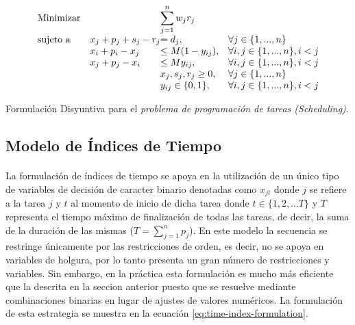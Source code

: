 \documentclass[spanish]{article}
\begin{document}
			\begin{eqfloat}
				\begin{equation}
					\begin{array}{ll@{}ll}
						\text{Minimizar}	& & \displaystyle\sum\limits_{j = 1}^{n} w_{j}r_{j} & \\
						\text{sujeto a}		& x_{j} + p_{j} + s_{j} - r_{j} 	&= d_{j}, 		& \forall j \in \{1,...,n\}\\
															&	x_{i} + p_{i} - x_{j} 					&\leq M(1-y_{ij}), 	& \forall i,j \in \{1,...,n\},  i < j\\
															&	x_{j} + p_{j} - x_{i} 					&\leq My_{ij}, 	& \forall i,j \in \{1,...,n\},  i < j\\
															&                               	&	x_{j}, s_{j}, r_{j} 	\geq 0, 	& \forall j \in \{1,...,n\} \\
															&                               				&	y_{ij} 	\in \{0,1\}, 	& \forall i,j \in \{1,...,n\},  i < j
					\end{array}
				\end{equation}
				\caption{Formulación Disyuntiva para el \emph{problema de programación de tareas (Scheduling)}.}
				\label{eq:disjunctive-formulation}
			\end{eqfloat}

		\subsection{Modelo de Índices de Tiempo}
		\label{sec:time-index}

			\paragraph{}
			La formulación de índices de tiempo se apoya en la utilización de un único tipo de variables de decisión de caracter binario denotadas como $x_{jt}$ donde $j$ se refiere a la tarea $j$ y $t$ al momento de inicio de dicha tarea donde $t \in \{1,2,...T\}$ y $T$ representa el tiempo máximo de finalización de todas las tareas, de decir, la suma de la duración de las mismas ($T = \sum_{j=1}^n p_j$). En este modelo la secuencia se restringe únicamente por las restricciones de orden, es decir, no se apoya en variables de holgura, por lo tanto presenta un gran número de restricciones y variables. Sin embargo, en la práctica esta formulación es mucho más eficiente que la descrita en la seccion anterior puesto que se resuelve mediante combinaciones binarias en lugar de ajustes de valores numéricos. La formulación de esta estrategia se muestra en la ecuación \eqref{eq:time-index-formulation}.
\end{document}
